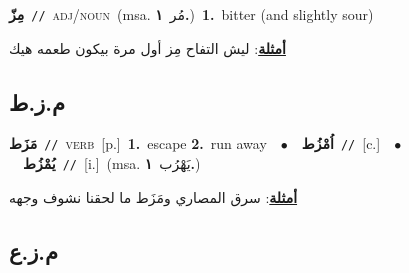 \documentclass[10pt,a4paper,twoside]{article} %
\begin{document}
\begin{multicols}{2}
{\setlength\topsep{0pt}\textbf{\foreignlanguage{arabic}{مِزّ}}\ {\color{gray}\texttt{//}\color{black}}\ \textsc{adj/noun}\ \color{gray}(msa. \foreignlanguage{arabic}{مُر}~\foreignlanguage{arabic}{\textbf{١.}})\color{black}\ \textbf{1.}~bitter (and slightly sour)\  \begin{flushright}\color{gray}\foreignlanguage{arabic}{\textbf{\underline{\foreignlanguage{arabic}{أمثلة}}}: ليش التفاح مِز أول مرة بيكون طعمه هيك}\end{flushright}\color{black}} \vspace{2mm}

\vspace{-3mm}
\subsection*{\color{blue}\foreignlanguage{arabic}{م.ز.ط}\color{blue}{}} 

{\setlength\topsep{0pt}\textbf{\foreignlanguage{arabic}{مَزَط}}\ {\color{gray}\texttt{//}\color{black}}\ \textsc{verb}\ [p.]\ \textbf{1.}~escape  \textbf{2.}~run away\ \ $\bullet$\ \ \setlength\topsep{0pt}\textbf{\foreignlanguage{arabic}{اُمْزُط}}\ {\color{gray}\texttt{//}\color{black}}\ [c.]\ \ $\bullet$\ \ \setlength\topsep{0pt}\textbf{\foreignlanguage{arabic}{يُمْزُط}}\ {\color{gray}\texttt{//}\color{black}}\ [i.]\ \color{gray}(msa. \foreignlanguage{arabic}{يَهْرُب}~\foreignlanguage{arabic}{\textbf{١.}})\color{black}\  \begin{flushright}\color{gray}\foreignlanguage{arabic}{\textbf{\underline{\foreignlanguage{arabic}{أمثلة}}}: سرق المصاري ومَزَط ما لحقنا نشوف وجهه}\end{flushright}\color{black}} \vspace{2mm}

\vspace{-3mm}
\subsection*{\color{blue}\foreignlanguage{arabic}{م.ز.ع}\color{blue}{}} 


\end{multicols}
\end{document}
